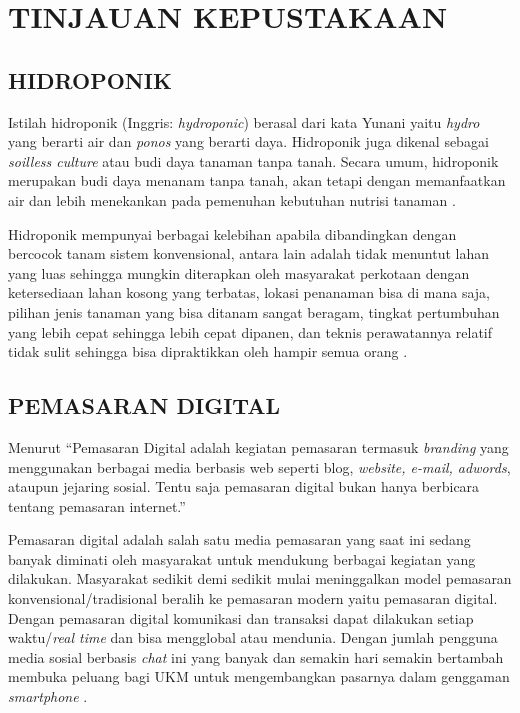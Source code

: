 \fancyhf{} 
\fancyfoot[C]{\thepage}
\chapter{TINJAUAN KEPUSTAKAAN}               

\section{\uppercase{Hidroponik}}
Istilah hidroponik (Inggris: \textit{hydroponic}) berasal dari kata Yunani yaitu \textit{hydro} yang berarti air dan \textit{ponos} yang berarti daya. Hidroponik juga dikenal sebagai \textit{soilless culture} atau budi daya tanaman tanpa tanah. Secara umum, hidroponik merupakan budi daya menanam tanpa tanah, akan tetapi dengan memanfaatkan air dan lebih menekankan pada pemenuhan kebutuhan nutrisi tanaman \citep{alviani2015bertanam}.

\par Hidroponik mempunyai berbagai kelebihan apabila dibandingkan dengan bercocok tanam sistem konvensional, antara lain adalah tidak menuntut lahan yang luas sehingga mungkin diterapkan oleh masyarakat perkotaan dengan ketersediaan lahan kosong yang terbatas, lokasi penanaman bisa di mana saja, pilihan jenis tanaman yang bisa ditanam sangat beragam, tingkat pertumbuhan yang lebih cepat sehingga lebih cepat dipanen, dan teknis perawatannya relatif tidak sulit sehingga bisa dipraktikkan oleh hampir semua orang \citep{iqbal2016simpel}.

\section{\uppercase{Pemasaran Digital}}
Menurut \citep{tarigan2013creative} “Pemasaran Digital adalah kegiatan pemasaran termasuk \textit{branding} yang menggunakan berbagai media berbasis web seperti blog, \textit{website, e-mail, adwords}, ataupun jejaring sosial. Tentu saja pemasaran digital bukan hanya berbicara tentang pemasaran internet.”

Pemasaran digital adalah salah satu media pemasaran yang saat ini sedang banyak diminati oleh masyarakat untuk mendukung berbagai kegiatan yang dilakukan. Masyarakat sedikit demi sedikit mulai meninggalkan model pemasaran konvensional/tradisional beralih ke pemasaran modern yaitu pemasaran digital. Dengan pemasaran digital komunikasi dan transaksi dapat dilakukan setiap waktu/\textit{real time} dan bisa mengglobal atau mendunia. Dengan jumlah pengguna media sosial berbasis \textit{chat} ini yang banyak dan semakin hari semakin bertambah membuka peluang bagi UKM untuk mengembangkan pasarnya dalam genggaman \textit{smartphone} \citep{pradiani2017pengaruh}.


